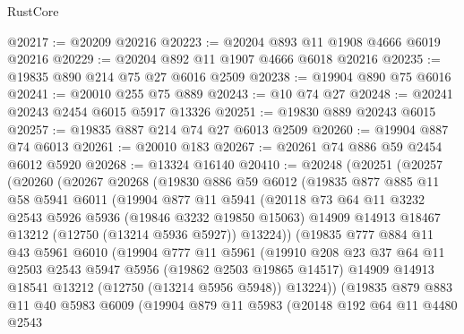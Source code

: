 \begin{lexlean}{RustCore}
\begin{coremodule}
@20217 := @20209 @20216
@20223 := @20204 @893 @11 @1908 @4666 @6019 @20216
@20229 := @20204 @892 @11 @1907 @4666 @6018 @20216
@20235 := @19835 @890 @214 @75 @27 @6016 @2509
@20238 := @19904 @890 @75 @6016
@20241 := @20010 @255 @75 @889
@20243 := @10 @74 @27
@20248 := @20241 @20243 @2454 @6015 @5917 @13326
@20251 := @19830 @889 @20243 @6015
@20257 := @19835 @887 @214 @74 @27 @6013 @2509
@20260 := @19904 @887 @74 @6013
@20261 := @20010 @183
@20267 := @20261 @74 @886 @59 @2454 @6012 @5920
@20268 := @13324 @16140
@20410 := @20248
    (@20251
      (@20257
        (@20260
          (@20267
            @20268
            (@19830
              @886
              @59
              @6012
              (@19835
                @877
                @885
                @11
                @58
                @5941
                @6011
                (@19904
                  @877
                  @11
                  @5941
                  (@20118
                    @73
                    @64
                    @11
                    @3232
                    @2543
                    @5926
                    @5936
                    (@19846 @3232 @19850 @15063)
                    @14909
                    @14913
                    @18467
                    @13212
                    (@12750 (@13214 @5936 @5927))
                    @13224))
                (@19835
                  @777
                  @884
                  @11
                  @43
                  @5961
                  @6010
                  (@19904
                    @777
                    @11
                    @5961
                    (@19910
                      @208
                      @23
                      @37
                      @64
                      @11
                      @2503
                      @2543
                      @5947
                      @5956
                      (@19862 @2503 @19865 @14517)
                      @14909
                      @14913
                      @18541
                      @13212
                      (@12750 (@13214 @5956 @5948))
                      @13224))
                  (@19835
                    @879
                    @883
                    @11
                    @40
                    @5983
                    @6009
                    (@19904
                      @879
                      @11
                      @5983
                      (@20148
                        @192
                        @64
                        @11
                        @4480
                        @2543

\end{coremodule}
\end{lexlean}
